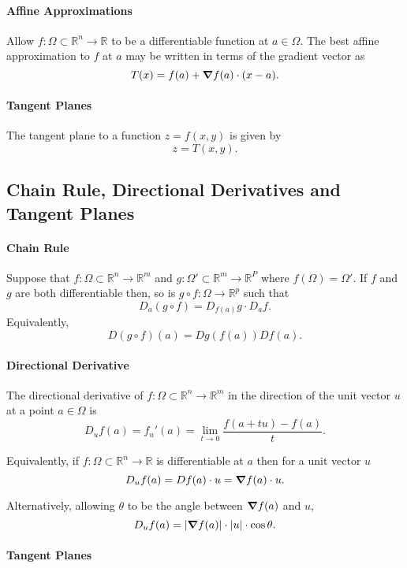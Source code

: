 \paragraph{Affine Approximations}
Allow \(f:\Omega\subset\mathbb{R}^n \to \mathbb{R}\) to be a differentiable
function at \(a\in \Omega\).
The best affine approximation to \(f\) at \(a\) may be written in terms of
the gradient vector as
\[
    T(x) = f(a) + \grad f(a) \cdot (x-a).
\]

\paragraph{Tangent Planes}
The tangent plane to a function \(z = f(x, y)\) is given by
\[ z = T(x, y).\]

\subsection{Chain Rule, Directional Derivatives and Tangent Planes}

\paragraph{Chain Rule}
Suppose that \(f: \Omega \subset \mathbb{R}^n \to \mathbb{R}^m\) and
\(g: \Omega' \subset \mathbb{R}^m \to \mathbb{R}^P\) where
\(f(\Omega) = \Omega'\).
If \(f\) and \(g\) are both differentiable then, so is
\(g\circ f: \Omega \to \mathbb{R}^p\) such that
\[
    D_a (g\circ f) = D_{f(a)}g \cdot D_a f.
\]
Equivalently,
\[
    D(g\circ f)(a) = Dg(f(a)) Df(a).
\]

\paragraph{Directional Derivative}
The directional derivative of 
\(f: \Omega \subset \mathbb{R}^n \to \mathbb{R}^m\)
in the direction of the unit vector \(u\) at a point \(a\in\Omega\) is
\[
    D_u f(a) = f_{u}'(a)
    =
    \lim_{t\to 0}  \dfrac{f(a + t u) - f(a)}{t}.
\]

Equivalently, if \(f: \Omega \subset \mathbb{R}^n \to \mathbb{R}\)
is differentiable at \(a\) then for a unit vector \(u\)
\[
    D_u f(a) = Df(a) \cdot u = \grad f(a)\cdot u.
\]

Alternatively, allowing \(\theta\) to be the angle between
\(\grad f(a)\) and \(u\),
\[D_u f(a) = |\grad f(a)| \cdot |u| \cdot \cos\theta.\]

\paragraph{Tangent Planes}

